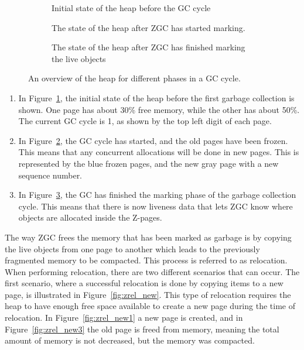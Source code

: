 \begin{figure}[H]
    \centering
    \begin{subfigure}[t]{.214\textwidth}
        \centering
        
        \caption{Initial state of the heap before the GC cycle}
        \label{fig:zrel1}
    \end{subfigure}%
    \hfill\vline\hfill
    \begin{subfigure}[t]{.32\textwidth}
        \centering
        
        \caption{The state of the heap after ZGC has started marking.}
        \label{fig:zrel2}
    \end{subfigure}%
    \hfill\vline\hfill
    \begin{subfigure}[t]{.32\textwidth}
        \centering
        
        \caption{The state of the heap after ZGC has finished marking the live objects}
        \label{fig:zrel3}
    \end{subfigure}%
    \caption{An overview of the heap for different phases in a GC cycle.}
    \label{fig:zgc_timeline}
\end{figure}

\begin{enumerate}
    \item In Figure~\ref*{fig:zrel1}, the initial state of the heap before the first garbage collection is shown. One page has about 30\% free memory, while the other has about 50\%. The current GC cycle is 1, as shown by the top left digit of each page.
    \item In Figure~\ref*{fig:zrel2}, the GC cycle has started, and the old pages have been frozen. This means that any concurrent allocations will be done in new pages. This is represented by the blue frozen pages, and the new gray page with a new sequence number.
    \item In Figure~\ref*{fig:zrel3}, the GC has finished the marking phase of the garbage collection cycle. This means that there is now liveness data that lets ZGC know where objects are allocated inside the Z-pages.
\end{enumerate}

The way ZGC frees the memory that has been marked as garbage is by copying the live objects from one page to another which leads to the previously fragmented memory to be compacted. This process is referred to as relocation. When performing relocation, there are two different scenarios that can occur. The first scenario, where a successful relocation is done by copying items to a new page, is illustrated in Figure~\ref{fig:zrel_new}. This type of relocation requires the heap to have enough free space available to create a new page during the time of relocation. In Figure~\ref*{fig:zrel_new1} a new page is created, and in Figure~\ref*{fig:zrel_new3} the old page is freed from memory, meaning the total amount of memory is not decreased, but the memory was compacted.

